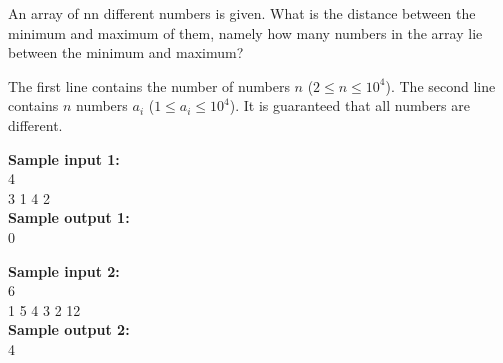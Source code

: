 \documentclass[a4paper]{article}
\begin{document}
An array of nn different numbers is given. What is the distance between the minimum and maximum of them, namely how many numbers in the array lie between the minimum and maximum?

The first line contains the number of numbers $n$ ($2 \le n \le 10^4$). The second line contains $n$ numbers $a_i$ ($1 \le a_i \le 10^4$). It is guaranteed that all numbers are different.

\LINE

\noindent \textbf{Sample input 1:}\\
4\\
3 1 4 2\\

\noindent \textbf{Sample output 1:}\\
0

\SPACE

\noindent \textbf{Sample input 2:}\\
6\\
1 5 4 3 2 12\\

\noindent \textbf{Sample output 2:}\\
4
\end{document}
